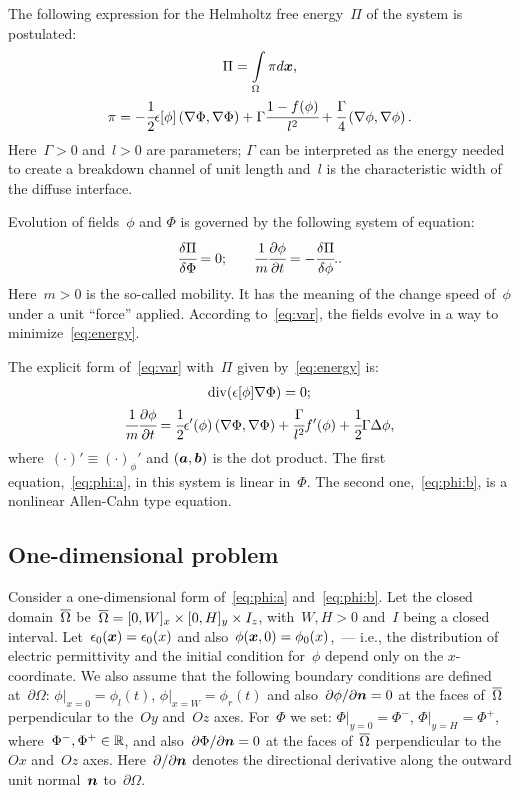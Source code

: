 The following expression for the Helmholtz free energy~$\Pi$ of the system
is postulated:
\begin{gather}
  \Pi = \int \limits_\Omega \pi d {\boldsymbol{x}} {\text{,}}
  \label{eq:energy} \\
  \pi = -\cfrac{1}{2} \epsilon[\phi] \left( \nabla \Phi, \nabla \Phi \right) + \Gamma \cfrac{1 - f(\phi)}{l^2} + \cfrac{\Gamma}{4} \left( \nabla \phi, \nabla \phi \right) {\text{.}}
  \label{eq:energy_density}
\end{gather}
Here~$\Gamma > 0$ and~$l > 0$ are parameters;
$\Gamma$ can be interpreted as the energy needed to create a breakdown
channel of unit length and~$l$ is the characteristic width of the
diffuse interface.

Evolution of fields~$\phi$ and $\Phi$ is governed by the following
system of equation:
%
\begin{equation}\label{eq:var}
\cfrac{\delta \Pi}{\delta \Phi} = 0 {\text{;}} \qquad \cfrac{1}{m}
\cfrac{\partial \phi}{\partial t} = -\cfrac{\delta \Pi}{\delta \phi} {\text{.}}.
\end{equation}
Here~$m > 0$ is the so-called mobility. It has the meaning of the change speed
of~$\phi$ under a unit ``force'' applied.
According to~\eqref{eq:var}, the fields evolve in a way to minimize~\eqref{eq:energy}.

The explicit form of~\eqref{eq:var} with~$\Pi$ given
by~\eqref{eq:energy} is:
\begin{gather}
  \Div(\epsilon[\phi] \nabla \Phi) = 0 \tsemicolon
  \label{eq:phi:a} \\ %
  \cfrac{1}{m} \partt{\phi} = \half \epsilon'(\phi) \scalsq{\Phi} + \cfrac{\Gamma}{l^2} f'(\phi) + \half \Gamma \Delta \phi,
  \label{eq:phi:b}
\end{gather}
%
where~$(\cdot)' \equiv (\cdot)_\phi'$ and $(\boldsymbol{a},\boldsymbol{b})$ is the
dot product.
The first equation,~\eqref{eq:phi:a}, in this system is linear in~$\Phi$.
The second one,~\eqref{eq:phi:b}, is a nonlinear Allen-Cahn type equation.

\subsection{One-dimensional problem}
Consider a one-dimensional form of~\eqref{eq:phi:a}
and~\eqref{eq:phi:b}.
Let the closed domain~${\overline{\Omega}}$ be~${\overline{\Omega}} = [0, W]_x \times [0, H]_y
\times I_z$,
with~$W,H > 0$ and~$I$ being a closed interval.
Let~$\epsilon_0({\boldsymbol{x}}) = \epsilon_0(x)$
and also~$\phi({\boldsymbol{x}}, 0) = \phi_0(x)$,~--- i.e., the distribution of
electric permittivity and the initial condition for~$\phi$ depend only on the
$x$-coordinate.
We also assume that the following boundary conditions are defined
at~$\partial\Omega$: $\phi|_{x = 0} = \phi_l(t)$, $\phi|_{x = W} = \phi_r(t)$
and also~$\partial \phi / \partial {\boldsymbol{n}}= 0$ at the faces of~${\overline{\Omega}}$ perpendicular to the~$Oy$ and~$Oz$
axes. For~$\Phi$ we set: $\Phi|_{y = 0} = \Phi^-$, $\Phi|_{y = H} = \Phi^+$, where~$\Phi^-, \Phi^+ \in {\mathbb{R}}$,
and also~$\partial \Phi / \partial {\boldsymbol{n}} = 0$ at the faces of~${\overline{\Omega}}$ perpendicular to the~$Ox$ and~$Oz$ axes.
Here~$\partial  / \partial {\boldsymbol{n}}$ denotes the directional derivative along the outward unit normal~$\boldsymbol{n}$ to~$\partial\Omega$.


